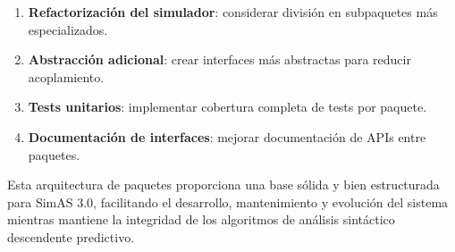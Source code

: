 \begin{enumerate}
    \item \textbf{Refactorización del simulador}: considerar división en subpaquetes más especializados.
    \item \textbf{Abstracción adicional}: crear interfaces más abstractas para reducir acoplamiento.
    \item \textbf{Tests unitarios}: implementar cobertura completa de tests por paquete.
    \item \textbf{Documentación de interfaces}: mejorar documentación de APIs entre paquetes.
\end{enumerate}

Esta arquitectura de paquetes proporciona una base sólida y bien estructurada para SimAS 3.0, facilitando el desarrollo, mantenimiento y evolución del sistema mientras mantiene la integridad de los algoritmos de análisis sintáctico descendente predictivo.


